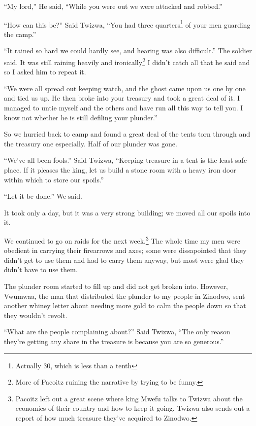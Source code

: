 ``My lord,'' He said, ``While you were out we were attacked and robbed.''

``How can this be?'' Said Twizwa, ``You had three quarters\footnote{Actually 30, which is less than a tenth} of your men guarding the camp.''

``It rained so hard we could hardly see, and hearing was also difficult.'' The soldier said. It was still raining heavily and ironically\footnote{More of Pacoitz ruining the narrative by trying to be funny.} I didn't catch all that he said and so I asked him to repeat it.

``We were all spread out keeping watch, and the ghost came upon us one by one and tied us up. He then broke into your treasury and took a great deal of it. I managed to untie myself and the others and have run all this way to tell you. I know not whether he is still defiling your plunder.''

So we hurried back to camp and found a great deal of the tents torn through and the treasury one especially. Half of our plunder was gone.

``We've all been fools.'' Said Twizwa, ``Keeping treasure in a tent is the least safe place. If it pleases the king, let us build a stone room with a heavy iron door within which to store our spoils.''

``Let it be done.'' We said.

It took only a day, but it was a very strong building; we moved all our spoils into it.

\tbreak

We continued to go on raids for the next week.\footnote{Pacoitz left out a great scene where king Mwefu talks to Twizwa about the economics of their country and how to keep it going. Twizwa also sends out a report of how much treasure they've acquired to Zinodwo.} The whole time my men were obedient in carrying their firearrows and axes; some were dissapointed that they didn't get to use them and had to carry them anyway, but most were glad they didn't have to use them.

The plunder room started to fill up and did not get broken into. However, Vwumwaa, the man that distributed the plunder to my people in Zinodwo, sent another whiney letter about needing more gold to calm the people down so that they wouldn't revolt.

``What are the people complaining about?'' Said Twizwa, ``The only reason they're getting any share in the treasure is because you are so generous.''

